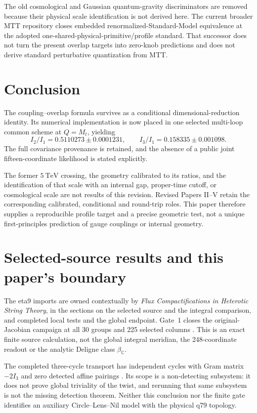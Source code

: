 \documentclass[11pt]{article}
\begin{document}
The old cosmological and Gaussian quantum-gravity discriminators are removed
because their physical scale identification is not derived here.  The current
broader MTT repository closes embedded renormalized-Standard-Model equivalence
at the adopted one-shared-physical-primitive/profile standard.  That successor
does not turn the present overlap targets into zero-knob predictions and does
not derive standard perturbative quantization from MTT.

\section{Conclusion}

The coupling--overlap formula survives as a conditional dimensional-reduction
identity.  Its numerical implementation is now placed in one selected
multi-loop common scheme at $Q=M_t$, yielding
\[
 I_2/I_1=0.5110273\pm0.0001231,\qquad
 I_3/I_1=0.158335\pm0.001098.
\]
The full covariance provenance is retained, and the absence of a public joint
fifteen-coordinate likelihood is stated explicitly.

The former $5~\mathrm{TeV}$ crossing, the geometry calibrated to its ratios,
and the identification of that scale with an internal gap, proper-time cutoff,
or cosmological scale are not results of this revision. Revised Papers II--V
retain the corresponding calibrated, conditional and round-trip roles.
This paper therefore supplies a
reproducible profile target and a precise geometric test, not a unique
first-principles prediction of gauge couplings or internal geometry.

\section{Selected-source results and this paper's boundary}
\label{sec:theta-source-consumers}

The eta9 imports are owned contextually by \emph{Flux Compactifications in
Heterotic String Theory}, in the sections on the selected source and the
integral comparison, and completed local tests and the global endpoint.
Gate~1 closes the original-Jacobian campaign at all 30 groups and 225 selected
columns \cite{ThetaGate1}. This is an exact finite source calculation, not
the global integral meridian, the 248-coordinate readout or the analytic
Deligne class $\beta_{\mathbb C}$.

The completed three-cycle transport has independent cycles with Gram matrix
$-2I_3$ and zero detected affine pairings \cite{ThetaCycles}. Its scope is
a non-detecting subsystem: it does not prove global triviality of the twist,
and rerunning that same subsystem is not the missing detection theorem.
Neither this conclusion nor the finite gate identifies an auxiliary
Circle--Lens--Nil model with the physical q79 topology.
\end{document}
